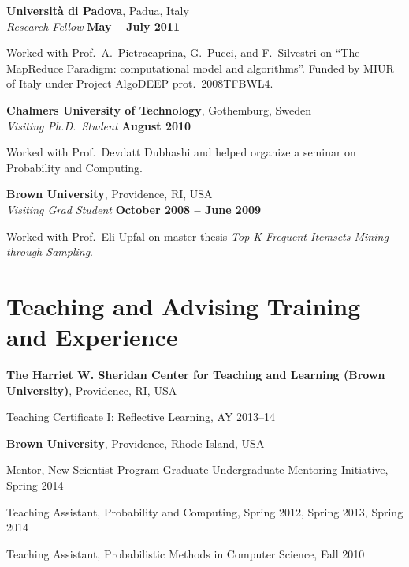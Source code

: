 \documentclass[margin,line]{resume}
\begin{document}
{\bf Universit\`a di Padova}, Padua, Italy\\
{\em Research Fellow} \hfill {\bf May -- July 2011}

\begin{list2}
\vspace*{.05in}
\item Worked with Prof.~A.~Pietracaprina, G.~Pucci, and F.~Silvestri on ``The MapReduce Paradigm:
computational model and algorithms''. Funded by MIUR of Italy under Project AlgoDEEP prot.~2008TFBWL4.
\end{list2}

{\bf Chalmers University of Technology}, Gothemburg, Sweden\\
{\em Visiting Ph.D.~Student} \hfill {\bf August 2010}

\begin{list2}
\vspace*{.05in}
\item Worked with Prof.~Devdatt Dubhashi and helped organize a seminar on Probability and Computing.
\end{list2}

{\bf Brown University}, Providence, RI, USA\\
{\em Visiting Grad Student} \hfill {\bf October 2008 -- June 2009}

\begin{list2}
\vspace*{.05in}
\item Worked with Prof.~Eli Upfal on master thesis \textit{Top-K Frequent
  Itemsets Mining through Sampling}.
\end{list2}

\section{\sc Teaching and Advising Training and Experience}
{\bf The Harriet W. Sheridan Center for Teaching and Learning (Brown
University)}, Providence, RI, USA
\begin{list2}
\vspace*{.05in}
\item Teaching Certificate I: Reflective Learning, AY 2013--14
\end{list2}

{\bf Brown University}, Providence, Rhode Island, USA

\begin{list2}
\vspace*{.05in}
\item Mentor, New Scientist Program Graduate-Undergraduate Mentoring Initiative, Spring 2014
\item Teaching Assistant, Probability and Computing, Spring 2012, Spring 2013, Spring 2014
\item Teaching Assistant, Probabilistic Methods in Computer Science, Fall 2010
\end{list2}
\end{document}
